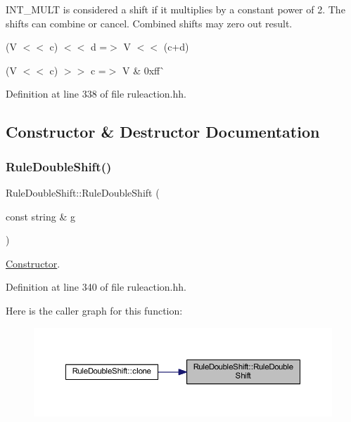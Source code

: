 I\+N\+T\+\_\+\+M\+U\+LT is considered a shift if it multiplies by a constant power of 2. The shifts can combine or cancel. Combined shifts may zero out result.


\begin{DoxyItemize}
\item {\ttfamily (V $<$$<$ c) $<$$<$ d =$>$ V $<$$<$ (c+d)}
\item {\ttfamily (V $<$$<$ c) $>$$>$ c} =$>$ V \& 0xff\`{} 
\end{DoxyItemize}

Definition at line 338 of file ruleaction.\+hh.



\subsection{Constructor \& Destructor Documentation}
\mbox{\label{class_rule_double_shift_acddca5015440583d4ac1131512ec44ea}} 
\subsubsection{\texorpdfstring{RuleDoubleShift()}{RuleDoubleShift()}}
{\footnotesize\ttfamily Rule\+Double\+Shift\+::\+Rule\+Double\+Shift (\begin{DoxyParamCaption}\item[{const string \&}]{g }\end{DoxyParamCaption})\hspace{0.3cm}{\ttfamily [inline]}}



\mbox{\hyperlink{class_constructor}{Constructor}}. 



Definition at line 340 of file ruleaction.\+hh.

Here is the caller graph for this function\+:
\nopagebreak
\begin{figure}[H]
\begin{center}
\leavevmode
\includegraphics[width=350pt]{class_rule_double_shift_acddca5015440583d4ac1131512ec44ea_icgraph}
\end{center}
\end{figure}


